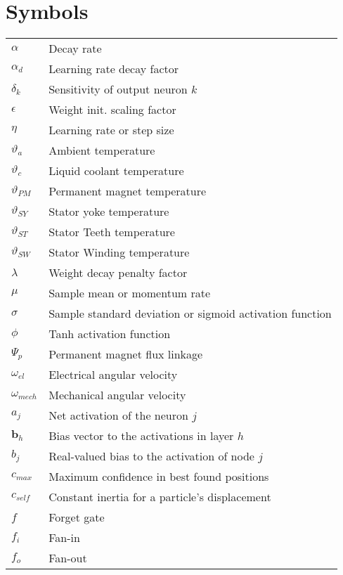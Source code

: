 \chapter{Symbols}
\label{chapter:symbols}

\begin{flushleft}
  \begin{longtable}{L{4.2cm}L{11.3cm}}
  $\alpha$ & Decay rate\\
  $\alpha_d$ & Learning rate decay factor\\
  $\delta_k$ & Sensitivity of output neuron $k$\\
  $\epsilon$ & Weight init. scaling factor\\
  $\eta$ & Learning rate or step size\\
  $\vartheta_a$ & Ambient temperature\\
  $\vartheta_c$ & Liquid coolant temperature\\
  $\vartheta_{PM}$ & Permanent magnet temperature\\
  $\vartheta_{SY}$ & Stator yoke temperature\\
  $\vartheta_{ST}$ & Stator Teeth temperature\\
  $\vartheta_{SW}$ & Stator Winding temperature\\
  $\lambda$ & Weight decay penalty factor\\
  $\mu$ & Sample mean or momentum rate\\
  $\sigma$ & Sample standard deviation or sigmoid activation function\\
   $\phi$ & Tanh activation function\\
  $\Psi_p$ & Permanent magnet flux linkage\\
  $\omega_{el}$ & Electrical angular velocity\\
  $\omega_{mech}$ & Mechanical angular velocity\\
  $a_j$ & Net activation of the neuron $j$\\
  $\bm b_h$ & Bias vector to the activations in layer $h$\\
  $b_j$ & Real-valued bias to the activation of node $j$\\
  $c_{max}$ & Maximum confidence in best found positions\\
  $c_{self}$ & Constant inertia for a particle's displacement\\
  $f$ & Forget gate\\
  $f_i$ & Fan-in\\
   $f_o$ & Fan-out\\

\end{longtable}
\end{flushleft}
